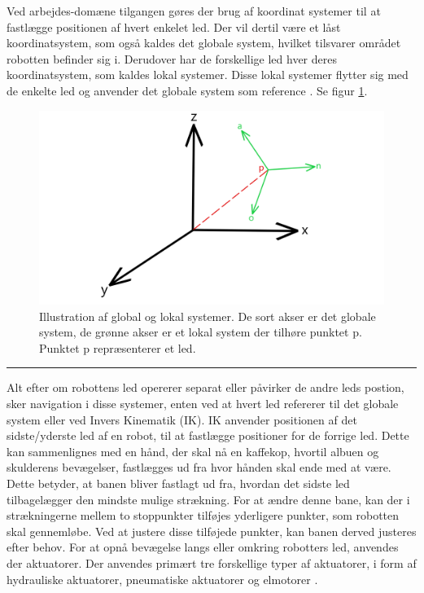 Ved arbejdes-domæne tilgangen gøres der brug af koordinat systemer til at fastlægge positionen af hvert enkelet led. Der vil dertil være et låst koordinatsystem, som også kaldes det globale system, hvilket tilsvarer området robotten befinder sig i. Derudover har de forskellige led hver deres koordinatsystem, som kaldes lokal systemer. Disse lokal systemer flytter sig med de enkelte led og anvender det globale system som reference \parencite{Castro2019TrajectoryManipulators}. Se figur \ref{fig:Global og lokal systemer}.

\begin{figure} [H]
    \centering
    \includegraphics[width=0.7\linewidth]{Sections/2 Problemanalyse/Media/Global og local frames.png}
    \caption{Illustration af global og lokal systemer. De sort akser er det globale system, de grønne akser er et lokal system der tilhøre punktet p. Punktet p repræsenterer et led.}
    \label{fig:Global og lokal systemer}
\end{figure} \plainbreak{-0.5}

Alt efter om robottens led opererer separat eller påvirker de andre leds postion, sker navigation i disse systemer, enten ved at hvert led refererer til det globale system eller ved Invers Kinematik (IK). IK anvender positionen af det sidste/yderste led af en robot, til at fastlægge positioner for de forrige led. Dette kan sammenlignes med en hånd, der skal nå en kaffekop, hvortil albuen og skulderens bevægelser,  fastlægges ud fra hvor hånden skal ende med at være. Dette betyder, at banen bliver fastlagt ud fra, hvordan det sidste led tilbagelægger den mindste mulige strækning. For at ændre denne bane, kan der i strækningerne mellem to stoppunkter tilføjes yderligere punkter, som robotten skal gennemløbe. Ved at justere disse tilføjede punkter, kan banen derved justeres efter behov. For at opnå bevægelse langs eller omkring robotters led, anvendes der aktuatorer. Der anvendes primært tre forskellige typer af aktuatorer, i form af hydrauliske aktuatorer, pneumatiske aktuatorer og elmotorer \parencite{Niku2020IntroductionApplications}.



